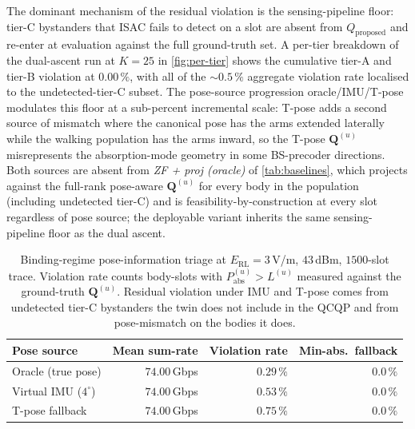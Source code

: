 \documentclass[journal,twocolumn,10pt]{IEEEtran}
\theoremstyle{plain}
\theoremstyle{remark}
\newcommand{\Pabs}{P_{\mathrm{abs}}}
\newcommand{\Qmat}{\mathbf{Q}}
\begin{document}
The dominant mechanism of the residual violation is the
sensing-pipeline floor: tier-C bystanders that ISAC fails to
detect on a slot are absent from $Q_{\mathrm{proposed}}$ and
re-enter at evaluation against the full ground-truth set. A
per-tier breakdown of the dual-ascent run at $K = 25$ in
\cref{fig:per-tier} shows
the cumulative tier-A and tier-B violation at $0.00\,\%$, with
all of the $\sim 0.5\,\%$ aggregate violation rate localised to
the undetected-tier-C subset. The pose-source progression
oracle/IMU/T-pose modulates this floor at a sub-percent
incremental scale: T-pose adds a second source of mismatch where
the canonical pose has the arms extended laterally while the
walking population has the arms inward, so the T-pose
$\Qmat^{(u)}$ misrepresents the absorption-mode geometry in some
BS-precoder directions. Both sources are absent from
\emph{ZF + proj (oracle)} of \cref{tab:baselines}, which projects
against the full-rank pose-aware $\Qmat^{(u)}$ for every body in
the population (including undetected tier-C) and is
feasibility-by-construction at every slot regardless of pose
source; the deployable variant inherits the same sensing-pipeline
floor as the dual ascent.

\begin{table}[!t]
\caption{Binding-regime pose-information triage at
$E_{\mathrm{RL}} = 3\,$V/m, $43\,$dBm, $1500$-slot trace. Violation
rate counts body-slots with $\Pabs^{(u)} > L^{(u)}$ measured against
the ground-truth $\Qmat^{(u)}$. Residual violation under IMU and
T-pose comes from undetected tier-C bystanders the twin does not
include in the QCQP and from pose-mismatch on the bodies it does.}
\label{tab:pose-triage}
\centering
\small
\begin{tabular}{@{}lrrr@{}}
\toprule
Pose source & Mean sum-rate & Violation rate & Min-abs.\ fallback \\
\midrule
Oracle (true pose) & $74.00\,$Gbps & $0.29\,\%$ & $0.0\,\%$ \\
Virtual IMU ($4^\circ$) & $74.00\,$Gbps & $0.53\,\%$ & $0.0\,\%$ \\
T-pose fallback & $74.00\,$Gbps & $0.75\,\%$ & $0.0\,\%$ \\
\bottomrule
\end{tabular}
\end{table}
\end{document}
